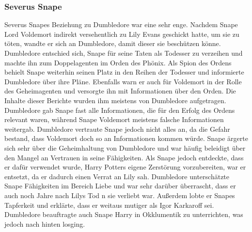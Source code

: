 \documentclass[a4paper, 10pt]{article}
\begin{document}
\subsubsection*{\large Severus Snape}
Severus Snapes Beziehung zu Dumbledore war eine sehr enge. Nachdem Snape Lord Voldemort indirekt versehentlich zu Lily Evans geschickt hatte, um sie zu töten, wandte er sich an Dumbledore, damit dieser sie beschützen könne. Dumbledore entschied sich, Snape für seine Taten als Todesser zu verzeihen und machte ihn zum Doppelagenten im Orden des Phönix.
\vspace{10pt}
\newline
{}  
Als Spion des Ordens behielt Snape weiterhin seinen Platz in den Reihen der Todesser und informierte Dumbledore über ihre Pläne. Ebenfalls warn er auch für Voldemort in der Rolle des Geheimagenten und versorgte ihn mit Informationen über den Orden. Die Inhalte dieser Berichte wurden ihm meistens von Dumbledore aufgetragen. Dumbledore gab Snape fast alle Informationen, die für den Erfolg des Ordens relevant waren, während Snape Voldemort meistens falsche Informationen weitergab.
\vspace{10pt}
\newline
{}  
Dumbledore vertraute Snape jedoch nicht alles an, da die Gefahr bestand, dass Voldemort doch so an Informationen kommen würde. Snape ärgerte sich sehr über die Geheimhaltung von Dumbledore und war häufig beleidigt über den Mangel an Vertrauen in seine Fähigkeiten. Als Snape jedoch entdeckte, dass er dafür verwendet wurde, Harry Potters eigene Zerstörung vorzubereiten, war er entsetzt, da er dadurch einen Verrat an Lily sah.
\vspace{10pt}
\newline
{}  
Dumbledore unterschätzte Snape Fähigkeiten im Bereich Liebe und war sehr darüber überrascht, dass er auch noch Jahre nach Lilys Tod n sie verliebt war. Außerdem lobte er Snapes Tapferkeit und erklärte, dass er weitaus mutiger als Igor Karkaroff sei. Dumbledore beauftragte auch Snape Harry in Okklumentik zu unterrichten, was jedoch nach hinten losging.
\vspace{10pt}
\newline
{}  
\end{document}
